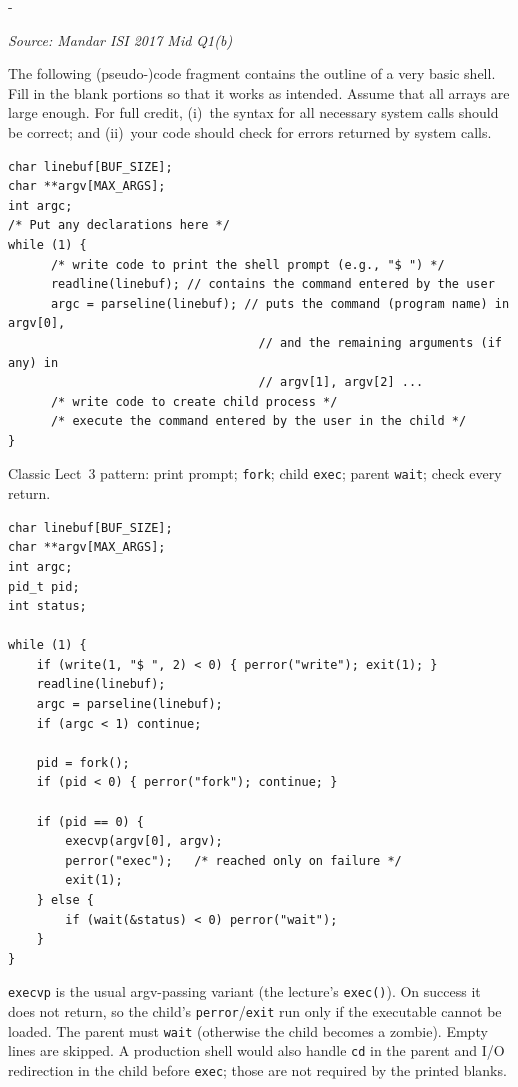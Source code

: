 \documentclass[11pt,a4paper]{article}
\makeatletter
\newcommand{\keepspace}[1]{\par\penalty-100\begingroup
  \setlength{\dimen@}{#1}\dimen@ii\pagegoal\advance\dimen@ii-\pagetotal
  \ifdim\dimen@>\dimen@ii\ifdim\dimen@ii>\z@\vfil\fi\break\fi\endgroup}
\newcounter{qn}[section]
\newenvironment{Qn}[4]{%
  \refstepcounter{qn}\keepspace{7\baselineskip}%
  \begin{tcolorbox}[qboxstyle, title={Q\thesection.\theqn\ \ [#1 \textbar\ #2]\ \ #4}]%
  {\footnotesize\color{g3}\textit{Source: #3}}\par\smallskip%
}{%
  \end{tcolorbox}%
}
\newenvironment{Sol}{%
  \begin{tcolorbox}[sboxstyle, title={Solution}]%
}{%
  \end{tcolorbox}\vspace{0.35em}%
}
\makeatother
\begin{document}
\begin{Qn}{Hard}{Lect 3}{Mandar ISI 2017 Mid Q1(b)}{Fill in a mini-shell: \texttt{fork}/\texttt{exec}/\texttt{wait} with error checks}
The following (pseudo-)code fragment contains the outline of a very basic shell. Fill in the blank portions so that it works as intended. Assume that all arrays are large enough. For full credit, (i)~the syntax for all necessary system calls should be correct; and (ii)~your code should check for errors returned by system calls.
\begin{lstlisting}[numbers=none]
char linebuf[BUF_SIZE];
char **argv[MAX_ARGS];
int argc;
/* Put any declarations here */
while (1) {
      /* write code to print the shell prompt (e.g., "$ ") */
      readline(linebuf); // contains the command entered by the user
      argc = parseline(linebuf); // puts the command (program name) in argv[0],
                                   // and the remaining arguments (if any) in
                                   // argv[1], argv[2] ...
      /* write code to create child process */
      /* execute the command entered by the user in the child */
}
\end{lstlisting}
\end{Qn}
\begin{Sol}
Classic Lect~3 pattern: print prompt; \texttt{fork}; child \texttt{exec}; parent \texttt{wait}; check every return.
\begin{lstlisting}[numbers=none]
char linebuf[BUF_SIZE];
char **argv[MAX_ARGS];
int argc;
pid_t pid;
int status;

while (1) {
    if (write(1, "$ ", 2) < 0) { perror("write"); exit(1); }
    readline(linebuf);
    argc = parseline(linebuf);
    if (argc < 1) continue;

    pid = fork();
    if (pid < 0) { perror("fork"); continue; }

    if (pid == 0) {
        execvp(argv[0], argv);
        perror("exec");   /* reached only on failure */
        exit(1);
    } else {
        if (wait(&status) < 0) perror("wait");
    }
}
\end{lstlisting}
\texttt{execvp} is the usual argv-passing variant (the lecture's \texttt{exec()}). On success it does not return, so the child's \texttt{perror}/\texttt{exit} run only if the executable cannot be loaded. The parent must \texttt{wait} (otherwise the child becomes a zombie). Empty lines are skipped. A production shell would also handle \texttt{cd} in the parent and I/O redirection in the child before \texttt{exec}; those are not required by the printed blanks.
\end{Sol}
\end{document}
